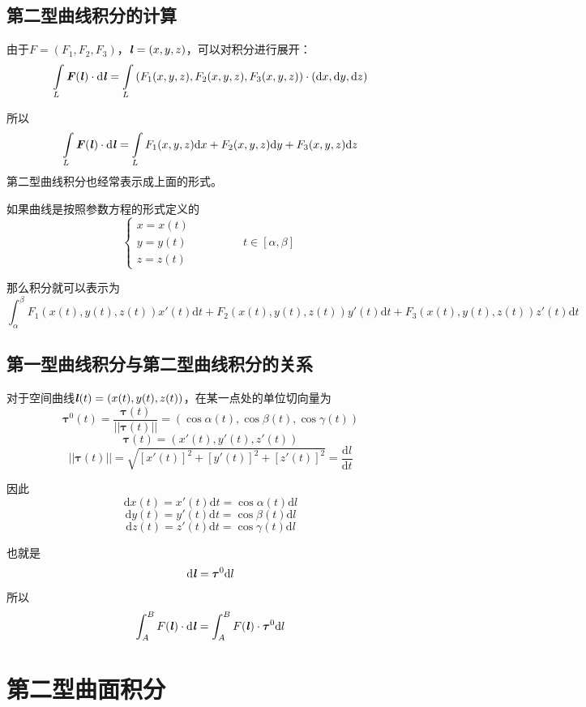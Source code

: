 \documentclass[UTF8,openany]{book}
\begin{document}
	\subsection{第二型曲线积分的计算}
	由于$F=(F_1,F_2,F_3)$，$\textbf{\textit{l}}=(x,y,z)$，可以对积分进行展开：
	$$\int\limits_{L}\textbf{\textit{F}}(\textbf{\textit{l}})\cdot\mathrm{d}\textbf{\textit{l}}=
	\int\limits_{L}\left(F_1(x,y,z),F_2(x,y,z),F_3(x,y,z)\right)\cdot(\mathrm{d}x,\mathrm{d}y,\mathrm{d}z)$$\par
	所以
	$$\int\limits_{L}\textbf{\textit{F}}(\textbf{\textit{l}})\cdot\mathrm{d}\textbf{\textit{l}}=
	\int\limits_{L}F_1(x,y,z)\mathrm{d}x+F_2(x,y,z)\mathrm{d}y+F_3(x,y,z)\mathrm{d}z$$
	第二型曲线积分也经常表示成上面的形式。\par
	如果曲线是按照参数方程的形式定义的
	$$\begin{cases}
	x=x(t)\\y=y(t)&\qquad\qquad t\in[\alpha,\beta]\\z=z(t)
	\end{cases}$$\par
	那么积分就可以表示为
	$$\int_{\alpha}^{\beta}F_1(x(t),y(t),z(t))x'(t)\mathrm{d}t+
	F_2(x(t),y(t),z(t))y'(t)\mathrm{d}t+F_3(x(t),y(t),z(t))z'(t)\mathrm{d}t$$
	\subsection{第一型曲线积分与第二型曲线积分的关系}
	对于空间曲线$\textbf{\textit{l}}(t)=(x(t),y(t),z(t))$，在某一点处的单位切向量为
	$$\boldsymbol{\tau}^{0}(t)=\frac{\boldsymbol{\tau}(t)}{||\boldsymbol{\tau}(t)||}=(\cos\alpha(t),\cos\beta(t),\cos\gamma(t))$$
	$$\boldsymbol{\tau}(t)=(x'(t),y'(t),z'(t))$$
	$$||\boldsymbol{\tau}(t)||=\sqrt{[x'(t)]^2+[y'(t)]^2+[z'(t)]^2}=\frac{\mathrm{d}l}{\mathrm{d}t}$$\par
	因此
	$$\mathrm{d}x(t)=x'(t)\mathrm{d}t=\cos\alpha(t)\textrm{d}l$$
	$$\mathrm{d}y(t)=y'(t)\mathrm{d}t=\cos\beta(t)\textrm{d}l$$
	$$\mathrm{d}z(t)=z'(t)\mathrm{d}t=\cos\gamma(t)\textrm{d}l$$\par
	也就是
	$$\mathrm{d}\textbf{\textit{l}}=\boldsymbol{\tau}^{0}\mathrm{d}l$$\par
	所以
	$$\int_{A}^{B}F(\textbf{\textit{l}})\cdot\mathrm{d}\textbf{\textit{l}}=\int_{A}^{B}F(\textbf{\textit{l}})\cdot\boldsymbol{\tau}^0\mathrm{d}l$$
	\section{第二型曲面积分}
\end{document}
